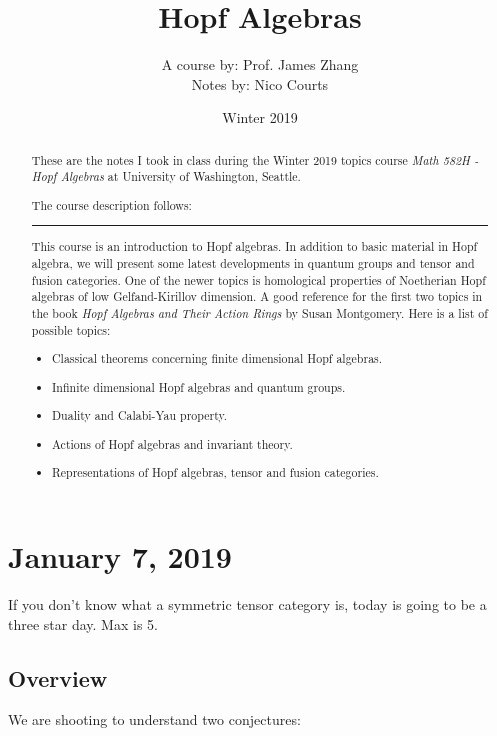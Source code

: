 \documentclass[12pt]{article}
\theoremstyle{break}
\theoremstyle{nonumberbreak}
\theoremstyle{changebreak}
\theoremstyle{break}
\theoremstyle{nonumberbreak}
\theoremstyle{nonumberplain}
\theoremstyle{change}
\newcommand*{\brk}{
\rule{2in}{.1pt}
}
\begin{document}
\title{Hopf Algebras\vspace{-1ex}}
\author{A course by: Prof. James Zhang\\
Notes by: Nico Courts}
\date{Winter 2019}
\maketitle

\renewcommand{\abstractname}{Introduction}
\begin{abstract}
	These are the notes I took in class during the Winter 2019 topics course
	\textit{Math 582H - Hopf Algebras} at University of Washington, Seattle. 
	
	The course description follows:

	\brk

	This course is an introduction to Hopf algebras. In addition to basic material in 
	Hopf algebra, we will present some latest developments in quantum groups and tensor 
	and fusion categories. One of the newer topics is homological properties of 
	Noetherian Hopf algebras of low Gelfand-Kirillov dimension. A good reference for 
	the first two topics in the book \textit{Hopf Algebras and Their Action Rings} by 
	Susan Montgomery. Here is a list of possible topics:

\begin{itemize}
	\item Classical theorems concerning finite dimensional Hopf algebras.
	\item Infinite dimensional Hopf algebras and quantum groups.
	\item Duality and Calabi-Yau property.
	\item Actions of Hopf algebras and invariant theory.
	\item Representations of Hopf algebras, tensor and fusion categories.
\end{itemize}
\end{abstract}

\section{January 7, 2019}
If you don't know what a symmetric tensor category is, today is going to be a three 
star day. Max is 5.

\subsection{Overview}
We are shooting to understand two conjectures:
\end{document}
